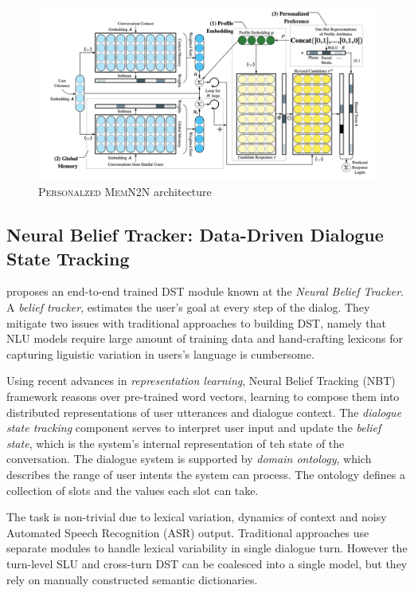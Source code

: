\documentclass[11pt,a4paper]{article}
\begin{document}
\begin{figure}[t]
  \centering
  \includegraphics[width=\textwidth]{images/personalized.png}
  \caption{\textsc{Personalzed MemN2N} architecture}
\end{figure}

\subsection{Neural Belief Tracker: Data-Driven Dialogue State Tracking}

\cite{Mrksic2016NeuralBT} proposes an end-to-end trained DST module known at the \textit{Neural Belief Tracker}. A \textit{belief tracker}, estimates the user's goal at every step of the dialog. They mitigate two issues with traditional approaches to building DST, namely that NLU models require large amount of training data and hand-crafting lexicons for capturing liguistic variation in users's language is cumbersome.

Using recent advances in \textit{representation learning}, Neural Belief Tracking (NBT) framework reasons over pre-trained word vectors, learning to compose them into distributed representations of user utterances and dialogue context. The \textit{dialogue state tracking} component serves to interpret user input and update the \textit{belief state}, which is the system's internal representation of teh state of the conversation. The dialogue system is supported by \textit{domain ontology}, which describes the range of user intents the system can process. The ontology defines a collection of slots and the values each slot can take.

The task is non-trivial due to lexical variation, dynamics of context and noisy Automated Speech Recognition (ASR) output. Traditional approaches use separate modules to handle lexical variability in single dialogue turn. However the turn-level SLU and cross-turn DST can be coalesced into a single model, but they rely on manually constructed semantic dictionaries.
\end{document}
